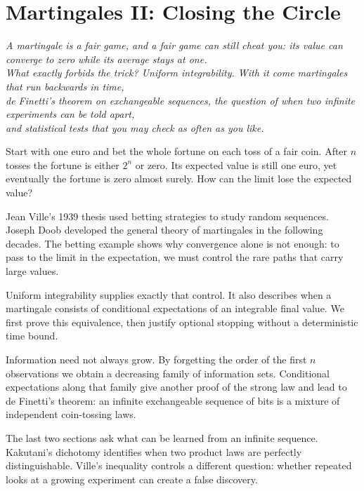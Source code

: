 \chapter{Martingales II: Closing the Circle}
\begin{center}\itshape
A martingale is a fair game, and a fair game can still cheat you: its value can converge to zero while its average stays at one.\\
What exactly forbids the trick? Uniform integrability. With it come martingales that run backwards in time,\\
de Finetti's theorem on exchangeable sequences, the question of when two infinite experiments can be told apart,\\
and statistical tests that you may check as often as you like.
\end{center}

Start with one euro and bet the whole fortune on each toss of a fair coin. After $n$ tosses the fortune is either $2^n$ or zero. Its expected value is still one euro, yet eventually the fortune is zero almost surely. How can the limit lose the expected value?

Jean Ville's 1939 thesis used betting strategies to study random sequences. Joseph Doob developed the general theory of martingales in the following decades. The betting example shows why convergence alone is not enough: to pass to the limit in the expectation, we must control the rare paths that carry large values.

Uniform integrability supplies exactly that control. It also describes when a martingale consists of conditional expectations of an integrable final value. We first prove this equivalence, then justify optional stopping without a deterministic time bound.

Information need not always grow. By forgetting the order of the first $n$ observations we obtain a decreasing family of information sets. Conditional expectations along that family give another proof of the strong law and lead to de Finetti's theorem: an infinite exchangeable sequence of bits is a mixture of independent coin-tossing laws.

The last two sections ask what can be learned from an infinite sequence. Kakutani's dichotomy identifies when two product laws are perfectly distinguishable. Ville's inequality controls a different question: whether repeated looks at a growing experiment can create a false discovery.


